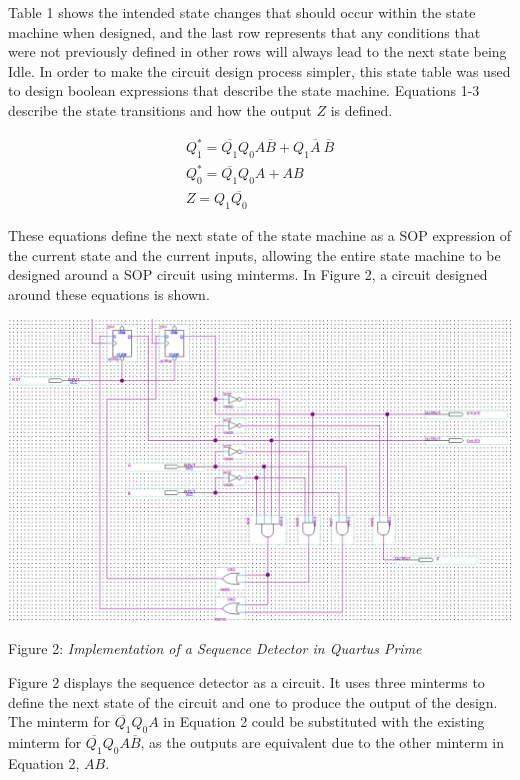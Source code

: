 \documentclass[\FontSize\FontUnit,letterpaper,oneside]{article}
\begin{document}
Table 1 shows the intended state changes that should occur within the state machine
when designed, and the last row represents that any conditions that were not previously
defined in other rows will always lead to the next state being Idle. In order to make the 
circuit design process simpler, this state table
was used to design boolean expressions that describe the state machine. Equations 1-3 describe
the state transitions and how the output $Z$ is defined.

\begin{align}
  Q_1^* = \overline{Q_1}Q_0A\overline{B} + Q_1\overline{A}\ \overline{B} \\
  Q_0^* = \overline{Q_1}Q_0A + AB \\
  Z = Q_1\overline{Q_0}
\end{align}

These equations define the next state of the state machine as a SOP expression of
the current state and the current inputs, allowing the entire state machine to be designed
around a SOP circuit using minterms. In Figure 2, a circuit designed around these equations is shown.

\begin{center}
  \includegraphics[scale=0.46]{circuit.png}
\end{center}
\begin{center}
  Figure 2: \textit{Implementation of a Sequence Detector in Quartus Prime}
\end{center}

Figure 2 displays the sequence detector as a circuit. It uses three minterms to define
the next state of the circuit and one to produce the output of the design. The minterm
for $\overline{Q_1}Q_0A$ in Equation 2 could be substituted with the existing minterm for 
$\overline{Q_1}Q_0A\overline{B}$, as the outputs are equivalent due to the other minterm in
Equation 2, $AB$.
\end{document}
